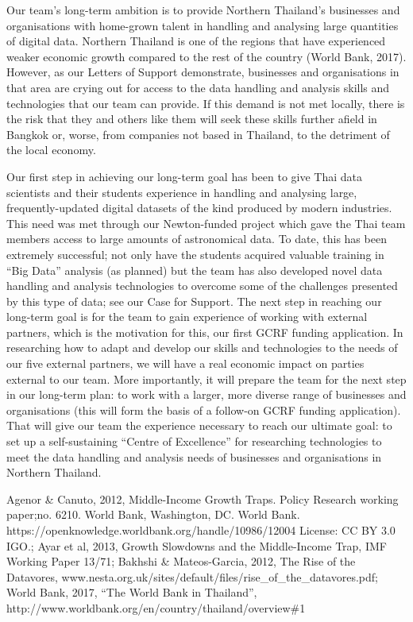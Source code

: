 \documentclass[11pt]{article}
\begin{document}
  \vspace{2mm}
  \noindent
  Our team's long-term ambition is to provide Northern Thailand's businesses and organisations with home-grown talent in handling and analysing large quantities of digital data. Northern Thailand is one of the regions that have experienced weaker economic growth compared to the rest of the country (World Bank, 2017). However, as our Letters of Support demonstrate, businesses and organisations in that area are crying out for access to the data handling and analysis skills and technologies that our team can provide. If this demand is not met locally, there is the risk that they and others like them will seek these skills further afield in Bangkok or, worse, from companies not based in Thailand, to the detriment of the local economy.
  
  \vspace{2mm}
  \noindent
  Our first step in achieving our long-term goal has been to give Thai data scientists and their students experience in handling and analysing large, frequently-updated digital datasets of the kind produced by modern industries. This need was met through our Newton-funded project which gave the Thai team members access to large amounts of astronomical data. To date, this has been extremely successful; not only have the students acquired valuable training in ``Big Data'' analysis (as planned) but the team has also developed novel data handling and analysis technologies to overcome some of the challenges presented by this type of data; see our Case for Support. The next step in reaching our long-term goal is for the team to gain experience of working with external partners, which is the motivation for this, our first GCRF funding application. In researching how to adapt and develop our skills and technologies to the needs of our five external partners, we will have a real economic impact on parties external to our team. More importantly, it will prepare the team for the next step in our long-term plan: to work with a larger, more diverse range of businesses and organisations (this will form the basis of a follow-on GCRF funding application). That will give our team the experience necessary to reach our ultimate goal: to set up a self-sustaining ``Centre of Excellence'' for researching technologies to meet the data handling and analysis needs of businesses and organisations in Northern Thailand.
  
  \vspace{2mm}
   {\scriptsize Agenor \& Canuto, 2012, Middle-Income Growth Traps. Policy Research working paper;no. 6210. World Bank, Washington, DC. World Bank. https://openknowledge.worldbank.org/handle/10986/12004 License: CC BY 3.0 IGO.; Ayar et al, 2013, Growth Slowdowns and the Middle-Income Trap, IMF Working Paper 13/71; Bakhshi \& Mateos-Garcia, 2012, The Rise of the Datavores, www.nesta.org.uk/sites/default/files/rise\_of\_the\_datavores.pdf; World Bank, 2017, ``The World Bank in Thailand'', http://www.worldbank.org/en/country/thailand/overview\#1}
  
  
  
  
\end{document}
